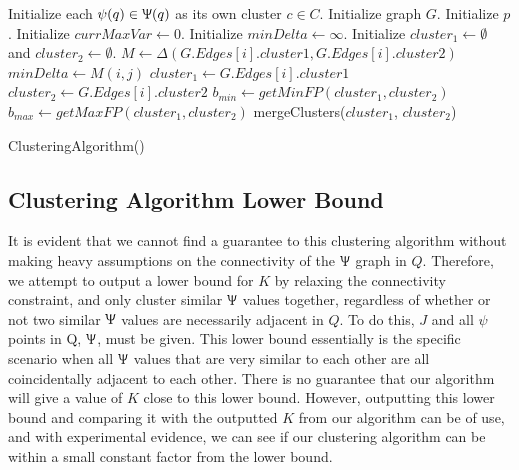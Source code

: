 \documentclass[conference]{IEEEtran}
\theoremstyle{plain}%
\begin{document}
\begin{algorithm}
\begin{algorithmic}[1]
\STATE Initialize each $\psi(q) \in \Uppsi(q)$ as its own cluster $c \in C$.
\STATE Initialize graph $G$. 
\STATE Initialize $p$. 
\STATE Initialize $currMaxVar \leftarrow 0$.
\STATE Initialize $minDelta \leftarrow \infty$.
\STATE Initialize $cluster_1 \leftarrow \emptyset$ and $cluster_2 \leftarrow \emptyset$.
\STATE $M \leftarrow \Delta(G.Edges[i].cluster1, G.Edges[i].cluster2)$ 
\STATE $minDelta \leftarrow M(i, j)$
\STATE $cluster_1 \leftarrow G.Edges[i].cluster1$
\STATE $cluster_2 \leftarrow G.Edges[i].cluster2$
\ENDIF
\ENDFOR
\STATE $b_{min} \leftarrow getMinFP( cluster_1, cluster_2 )$
\STATE $b_{max} \leftarrow getMaxFP( cluster_1, cluster_2 )$
\RETURN {}
\ELSE
\STATE mergeClusters($cluster_1$, $cluster_2$)
\ENDIF
\ENDWHILE
\end{algorithmic}
\caption{ClusteringAlgorithm()} 
\label{alg:clustering_3}
\end{algorithm}

\subsection{Clustering Algorithm Lower Bound}

It is evident that we cannot find a guarantee to this clustering algorithm without making heavy assumptions on the connectivity of the $\Uppsi$ graph in $Q$. Therefore, we attempt to output a lower bound for $K$ by relaxing the connectivity constraint, and only cluster similar $\Uppsi$ values together, regardless of whether or not two similar $\Uppsi$ values are necessarily adjacent in $Q$. To do this, $J$ and all $\psi$ points in Q, $\Uppsi$, must be given. This lower bound essentially is the specific scenario when all $\Uppsi$ values that are very similar to each other are all coincidentally adjacent to each other. There is no guarantee that our algorithm will give a value of $K$ close to this lower bound. However, outputting this lower bound and comparing it with the outputted $K$ from our algorithm can be of use, and with experimental evidence, we can see if our clustering algorithm can be within a small constant factor from the lower bound.
\end{document}
